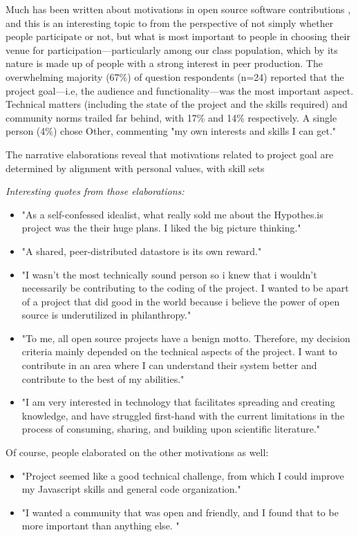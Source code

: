Much has been written about motivations in open source software
contributions \cite{vonKrogh2012}, and this is an interesting topic 
to from the perspective of not simply whether people participate or not, but what is 
most important to people in choosing their venue for participation---particularly among
our class population, which by its nature is made up of people with a strong interest in peer production. 
The overwhelming majority (67\%) of question respondents (n=24) 
reported that the project goal---i.e, the audience and functionality---was the most
important aspect. Technical matters (including the state of the project and the
skills required) and community norms trailed far behind, with 17\% and 14\%
respectively. A single person (4\%) chose Other, commenting "my own interests and skills I can get."

The narrative elaborations reveal that motivations related to project goal are determined by alignment with personal
values, with skill sets 

{\it Interesting quotes from those elaborations:}

\begin{itemize}
\item "As a self-confessed idealist, 
what really sold me about the Hypothes.is project was the their huge plans. I liked the big picture thinking."
\item "A shared, peer-distributed datastore is its own reward."
\item "I wasn't the most technically sound person so i knew that i wouldn't 
necessarily be contributing to the coding of the project. I wanted to be apart of a 
project that did good in the world because i believe the power of open source is 
underutilized in philanthropy."
\item "To me, all open source projects have a benign motto. Therefore, my decision criteria mainly
 depended on the technical aspects of the project. I want to contribute in an area where I 
 can understand their system better and contribute to the best of my abilities."
 \item "I am very interested in technology that facilitates spreading and creating knowledge, 
and have struggled first-hand with the current limitations in the process of consuming, 
sharing, and building upon scientific literature."
\end{itemize}


Of course, people elaborated on the other motivations as well:

\begin{itemize}
\item "Project seemed like a good technical challenge, from which I could improve my Javascript 
skills and general code organization."
\item "I wanted a community that was open and friendly, and I found that to be more 
important than anything else. "
\end{itemize}

